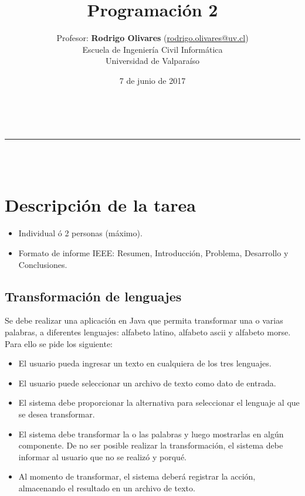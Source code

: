\documentclass[a4paper,10pt]{article}
\makeatletter
\newcommand{\linia}{\rule{\linewidth}{0.5pt}}
\theoremstyle{mytheor}
\renewcommand{\maketitle}{
    \begin{center}
        \vspace{2ex}
        {\huge \textsc{\@title}}
        \vspace{1ex} \\
        \linia \\
        \hfill \@date  \\ 
        \@author
        \vspace{4ex}
    \end{center}
}
\makeatother
\begin{document}
\title{{\huge Programaci\'on 2}}

\date{7 de junio de 2017}

\author{Profesor: \textbf{Rodrigo Olivares} (\href{mailto:rodrigo.olivares@uv.cl}{rodrigo.olivares@uv.cl}) \\ Escuela de Ingenier\'ia Civil  Inform\'atica \\ Universidad de Valpara\'iso \\}

\maketitle

\section{Descripci\'on de la tarea}

\begin{itemize}
    \item Individual \'o 2 personas (m\'aximo).
    \item Formato de informe IEEE: Resumen, Introducci\'on, Problema, Desarrollo y Conclusiones.
\end{itemize}

\subsection{Transformaci\'on de lenguajes}

Se debe realizar una aplicaci\'on en Java que permita transformar una o varias palabras, a diferentes lenguajes: alfabeto latino, alfabeto ascii y alfabeto morse. Para ello se pide los siguiente:

\begin{itemize}
    \item El usuario pueda ingresar un texto en cualquiera de los tres lenguajes.
    \item El usuario puede seleccionar un archivo de texto como dato de entrada.
    \item El sistema debe proporcionar la alternativa para seleccionar el lenguaje al que se desea transformar. 
    \item El sistema debe transformar la o las palabras y luego mostrarlas en alg\'un componente. De no ser posible realizar la transformaci\'on, el sistema debe informar al usuario que no se realiz\'o y porqu\'e.
    \item Al momento de transformar, el sistema deber\'a registrar la acci\'on, almacenando el resultado en un archivo de texto.
\end{itemize}
\end{document}
